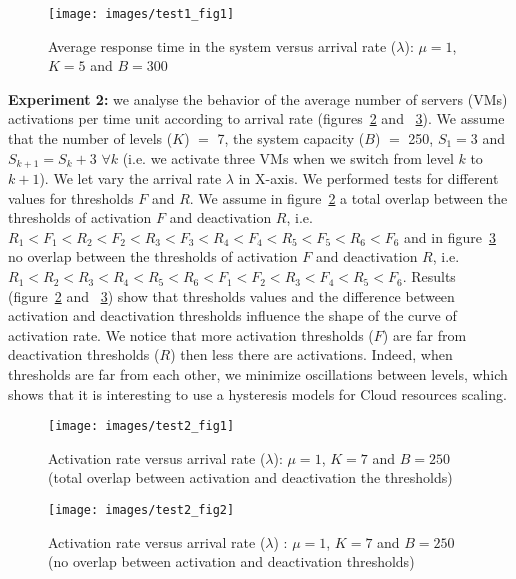 \documentclass[conference]{IEEEtran}
\begin{document}
\begin{figure}[!ht]
\centering
\texttt{[image: images/test1\_fig1]}
\caption{Average response time in the system versus arrival rate ($\lambda$): $\mu=1$, $K=5$ and $B=300$}
\label{fig:image-chap4-1_par_1-test1_fig1}
\end{figure}

\textbf{Experiment 2:} 
we analyse the behavior of the average number of servers (VMs) activations per time unit according to arrival rate 
(figures~\ref{fig:image-chap4-1_par_1_test2_fig1} and ~\ref{fig:image-chap4-1_par_1_test2_fig2}). We assume that the number of levels ($K$) $=$ 7, the system capacity ($B$) $=$ 250, $S_{1}=3$ 
and $S_{k+1}=S_{k}+3$ $\forall k$ (i.e. we activate three VMs when we switch from level $k$ to $k+1$). We let vary  the arrival rate $\lambda$ in X-axis. 
We performed tests for different values for thresholds $F$ and $R$. 
We assume in figure~\ref{fig:image-chap4-1_par_1_test2_fig1} a total overlap between the thresholds of activation $F$ and deactivation $R$, 
i.e. $R_1 < F_1 < R_2 < F_2 < R_3 < F_3 < R_4 < F_4 < R_5 < F_5 < R_6 < F_6$ and in figure~\ref{fig:image-chap4-1_par_1_test2_fig2} no overlap between the thresholds of activation $F$ and deactivation $R$, 
i.e. $R_1 < R_2 < R_3 < R_4 < R_5 < R_6 < F_1 < F_2 < R_3 < F_4 < R_5 < F_6$. 
Results (figure~\ref{fig:image-chap4-1_par_1_test2_fig1} and ~\ref{fig:image-chap4-1_par_1_test2_fig2}) show that thresholds values and the difference between activation and deactivation 
thresholds influence the shape of the curve of activation rate. We notice that more activation thresholds ($F$) are far from deactivation thresholds 
($R$) then less there are activations. Indeed, when thresholds are far from each other, 
we minimize oscillations between levels, which shows that it is interesting to use a hysteresis models for Cloud resources scaling.

\begin{figure}[!ht]
\centering
\texttt{[image: images/test2\_fig1]}
\caption{Activation rate versus arrival rate ($\lambda$): $\mu=1$, $K=7$ and $B=250$ (total overlap between activation and deactivation the thresholds)}
\label{fig:image-chap4-1_par_1_test2_fig1}
\end{figure}

\begin{figure}[!ht]
\centering
\texttt{[image: images/test2\_fig2]}
\caption{Activation rate versus arrival rate ($\lambda$) : $\mu=1$, $K=7$ and $B=250$ (no overlap between activation and deactivation thresholds)}
\label{fig:image-chap4-1_par_1_test2_fig2}
\end{figure}
\end{document}
